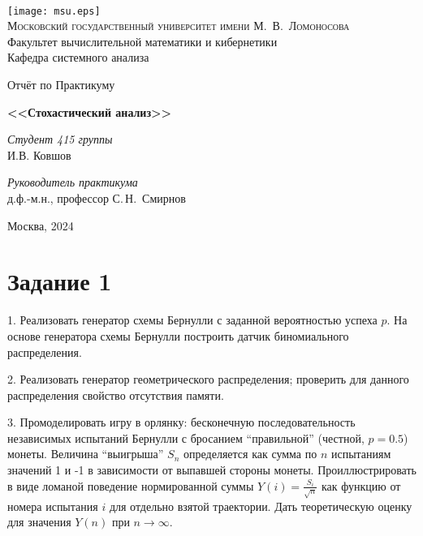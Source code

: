 \documentclass[11pt]{article}
\begin{document}
\thispagestyle{empty}

\begin{center}
\ \vspace{-3cm}

\texttt{[image: msu.eps]}\\
{\scshape Московский государственный университет имени М.~В.~Ломоносова}\\
Факультет вычислительной математики и кибернетики\\
Кафедра системного анализа

\vfill

{\LARGE Отчёт по Практикуму}

\vspace{1cm}

{\Huge\bfseries <<Стохастический анализ>>}
\end{center}

\vspace{1cm}

\begin{flushright}
  \large
  \textit{Студент 415 группы}\\
  И.В. Ковшов

  \vspace{5mm}

  \textit{Руководитель практикума}\\
  д.ф.-м.н., профессор С.\,Н.~Смирнов
\end{flushright}

\vfill

\begin{center}
Москва, 2024
\end{center}

\newpage

\section{Задание 1}

1. Реализовать генератор схемы Бернулли с заданной вероятностью успеха $p$. На
основе генератора схемы Бернулли построить датчик биномиального распределения.

2. Реализовать генератор геометрического распределения; проверить для данного распределения свойство отсутствия памяти.

3. Промоделировать игру в орлянку: бесконечную последовательность независимых испытаний Бернулли 
с бросанием “правильной” (честной, $p=0.5$) монеты. Величина “выигрыша” $S_n$ определяется как сумма по $n$ испытаниям значений 1 и -1 в зависимости от выпавшей стороны монеты. Проиллюстрировать в виде ломаной поведение нормированной суммы $Y(i)=\frac{S_i}{\sqrt{n}}$ как функцию от номера испытания $i$ для отдельно взятой траектории. Дать теоретическую оценку для значения $Y(n)$ при $n\to\infty$.
\end{document}
